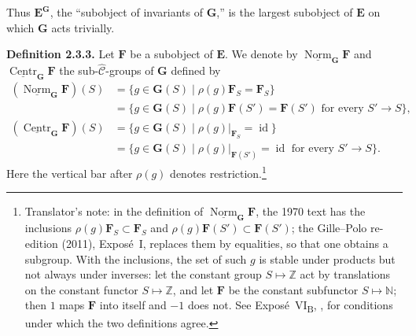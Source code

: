 Thus \(\mathbf E^{\mathbf G}\), the ``subobject of invariants of
\(\mathbf G\),'' is the largest subobject of \(\mathbf E\) on which
\(\mathbf G\) acts trivially.

\medskip
{}
\noindent\textbf{Definition 2.3.3.}
Let \(\mathbf F\) be a subobject of \(\mathbf E\). We denote by
\(\underline{\operatorname{Norm}}_{\mathbf G}\mathbf F\) and
\(\underline{\operatorname{Centr}}_{\mathbf G}\mathbf F\) the
sub-\(\widehat{\mathscr C}\)-groups of \(\mathbf G\) defined by
\begin{align*}
  (\underline{\operatorname{Norm}}_{\mathbf G}\mathbf F)(S)
    &={}
      \{g\in\mathbf G(S)\mid \rho(g)\mathbf F_S=\mathbf F_S\}\\
    &={}
      \{g\in\mathbf G(S)\mid
        \rho(g)\mathbf F(S')=\mathbf F(S')
        \text{ for every }S'\to S\},\\
  (\underline{\operatorname{Centr}}_{\mathbf G}\mathbf F)(S)
    &={}
      \{g\in\mathbf G(S)\mid
        \rho(g)|_{\mathbf F_S}=\operatorname{id}\}\\
    &={}
      \{g\in\mathbf G(S)\mid
        \rho(g)|_{\mathbf F(S')}=\operatorname{id}
        \text{ for every }S'\to S\}.
\end{align*}
Here the vertical bar after \(\rho(g)\) denotes restriction.\footnote{Translator's note: in the definition of
\(\underline{\operatorname{Norm}}_{\mathbf G}\mathbf F\), the 1970 text has
the inclusions \(\rho(g)\mathbf F_S\subset\mathbf F_S\) and
\(\rho(g)\mathbf F(S')\subset\mathbf F(S')\); the Gille--Polo re-edition
(2011), Exposé~I, replaces them by equalities, so that one obtains a
subgroup. With the inclusions, the set of such \(g\) is stable under
products but not always under inverses: let the constant group
\(S\mapsto\mathbb Z\) act by translations on the constant functor
\(S\mapsto\mathbb Z\), and let \(\mathbf F\) be the constant subfunctor
\(S\mapsto\mathbb N\); then \(1\) maps \(\mathbf F\) into itself and \(-1\)
does not. See Exposé~VI\textsubscript{B}, , for conditions under
which the two definitions agree.}

